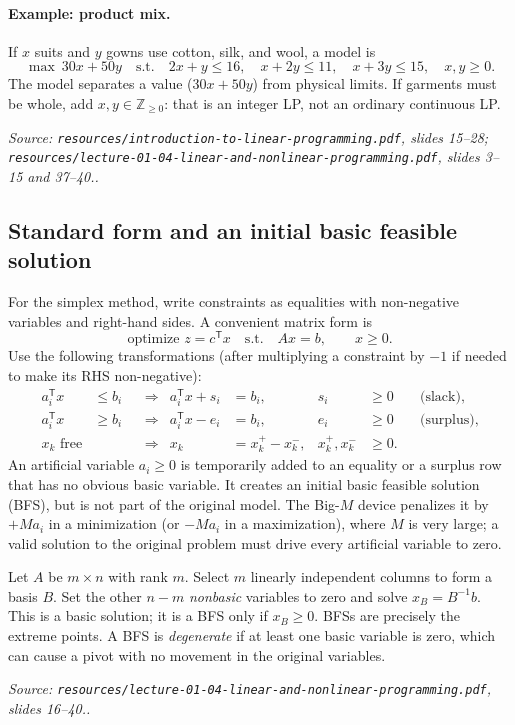 \documentclass[11pt,a4paper]{article}
\renewcommand{\texttt}[1]{\nolinkurl{#1}}
\newcommand{\T}{\mathsf{T}}
\newcommand{\source}[1]{\par\smallskip\noindent\textit{Source: #1.}\par\smallskip}
\begin{document}
\paragraph{Example: product mix.} If $x$ suits and $y$ gowns use cotton, silk, and wool, a model is
\[
 \max\ 30x+50y\quad\text{s.t.}\quad 2x+y\leq16,\quad x+2y\leq11,\quad x+3y\leq15,\quad x,y\geq0.
\]
The model separates a value ($30x+50y$) from physical limits. If garments must be whole, add $x,y\in\mathbb{Z}_{\geq0}$: that is an integer LP, not an ordinary continuous LP.
\source{\texttt{resources/introduction-to-linear-programming.pdf}, slides 15--28; \texttt{resources/lecture-01-04-linear-and-nonlinear-programming.pdf}, slides 3--15 and 37--40.}

\subsection{Standard form and an initial basic feasible solution}
For the simplex method, write constraints as equalities with non-negative variables and right-hand sides. A convenient matrix form is
\begin{equation}
 \text{optimize }z=c^\T x\quad\text{s.t.}\quad Ax=b,\qquad x\geq0.
\end{equation}
Use the following transformations (after multiplying a constraint by $-1$ if needed to make its RHS non-negative):
\begin{align*}
 a_i^\T x &\leq b_i &&\Longrightarrow& a_i^\T x+s_i&=b_i,&s_i&\geq0 &&\text{(slack)},\\
 a_i^\T x &\geq b_i &&\Longrightarrow& a_i^\T x-e_i&=b_i,&e_i&\geq0 &&\text{(surplus)},\\
 x_k\text{ free}&&&\Longrightarrow&x_k&=x_k^+-x_k^-,&x_k^+,x_k^-&\geq0.
\end{align*}
An artificial variable $a_i\geq0$ is temporarily added to an equality or a surplus row that has no obvious basic variable. It creates an initial basic feasible solution (BFS), but is not part of the original model. The Big-$M$ device penalizes it by $+Ma_i$ in a minimization (or $-Ma_i$ in a maximization), where $M$ is very large; a valid solution to the original problem must drive every artificial variable to zero.

Let $A$ be $m\times n$ with rank $m$. Select $m$ linearly independent columns to form a basis $B$. Set the other $n-m$ \emph{nonbasic} variables to zero and solve $x_B=B^{-1}b$. This is a basic solution; it is a BFS only if $x_B\geq0$. BFSs are precisely the extreme points. A BFS is \emph{degenerate} if at least one basic variable is zero, which can cause a pivot with no movement in the original variables.
\source{\texttt{resources/lecture-01-04-linear-and-nonlinear-programming.pdf}, slides 16--40.}
\end{document}

